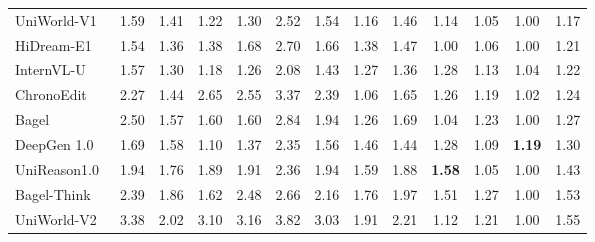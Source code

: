 \documentclass{llmxive}
\begin{document}
\begin{table}[t]
{\begin{tabular}{l|cccccc|cccccc}
            

            UniWorld-V1~\cite{lin2025uniworld}
            & 1.59 & 1.41 & 1.22 & 1.30 & 2.52 & \cellcolor[HTML]{C8C8C8}1.54 & 1.16 & 1.46 & 1.14 & 1.05 & 1.00
            & \cellcolor[HTML]{C8C8C8}1.17  \\

            HiDream-E1~\cite{cai2025hidream}
            & 1.54 & 1.36 & 1.38 & 1.68 & 2.70 &\cellcolor[HTML]{C8C8C8} 1.66  & 1.38 & 1.47 & 1.00 & 1.06 & 1.00
            & \cellcolor[HTML]{C8C8C8}1.21 \\

            InternVL-U~\cite{tian2026internvl}
            & 1.57 & 1.30 & 1.18 & 1.26 & 2.08 & \cellcolor[HTML]{C8C8C8}1.43 & 1.27 & 1.36 & 1.28 & 1.13 & 1.04
            &\cellcolor[HTML]{C8C8C8}1.22 \\

            ChronoEdit~\cite{wu2025chronoedit}
            & 2.27 & 1.44 & 2.65 & 2.55 & 3.37 & \cellcolor[HTML]{C8C8C8}2.39 & 1.06 & 1.65 & 1.26 & 1.19 & 1.02
            & \cellcolor[HTML]{C8C8C8}1.24 \\

            Bagel~\cite{deng2025emerging}
            & 2.50 & 1.57 & 1.60 & 1.60 & 2.84 & \cellcolor[HTML]{C8C8C8}1.94 & 1.26 & 1.69 & 1.04 & 1.23 & 1.00
            & \cellcolor[HTML]{C8C8C8}1.27 \\

            DeepGen 1.0~\cite{wang2026deepgen}
            & 1.69 & 1.58 & 1.10 & 1.37 & 2.35 & \cellcolor[HTML]{C8C8C8}1.56 & 1.46 & 1.44 & 1.28 & 1.09 & \textbf{1.19 }
            & \cellcolor[HTML]{C8C8C8}1.30 \\

            UniReason1.0~\cite{wang2026unireason}
            & 1.94 & 1.76 & 1.89 & 1.91 & 2.36 & \cellcolor[HTML]{C8C8C8}1.94 & 1.59 & 1.88 & \textbf{1.58} & 1.05 & 1.00
            & \cellcolor[HTML]{C8C8C8}1.43 \\

            Bagel-Think~\cite{deng2025emerging}
            & 2.39 & 1.86 & 1.62 & 2.48 & 2.66 & \cellcolor[HTML]{C8C8C8}2.16 & 1.76 & 1.97 & 1.51 & 1.27 & 1.00
            & \cellcolor[HTML]{C8C8C8}1.53 \\

            UniWorld-V2~\cite{li2025uniworld}
            & 3.38 & 2.02 & 3.10 & 3.16 & 3.82 & \cellcolor[HTML]{C8C8C8}3.03 & 1.91 & 2.21 & 1.12 & 1.21 & 1.00
            & \cellcolor[HTML]{C8C8C8}1.55  \\


\end{tabular}}
\end{table}
\end{document}
